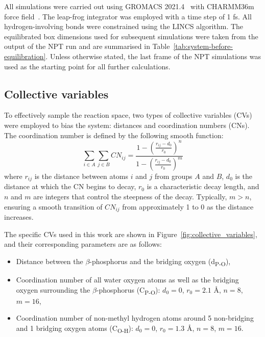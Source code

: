 All simulations were carried out using GROMACS 2021.4~\citep{abrahamGROMACSHighPerformance2015} with CHARMM36m force field~\citep{huangCHARMM36mImprovedForce2017}. The leap-frog integrator was employed with a time step of 1 fs. All hydrogen-involving bonds were constrained using the LINCS algorithm. The equilibrated box dimensions used for subsequent simulations were taken from the output of the NPT run and are summarised in Table~\ref{tab:system-before-equilibration}. Unless otherwise stated, the last frame of the NPT simulations was used as the starting point for all further calculations.



\subsection{Collective variables}
To effectively sample the reaction space, two types of collective variables (CVs) were employed to bias the system: distances and coordination numbers (CNs). The coordination number is defined by the following smooth function:
\begin{equation}
    \sum_{i \in A} \sum_{j \in B} CN_{ij} = \frac{1 - \left( \frac{r_{ij} - d_0}{r_0} \right)^n}{1 - \left( \frac{r_{ij} - d_0}{r_0} \right)^m}
    \label{eq:coordination_number}
\end{equation}
where $r_{ij}$ is the distance between atoms $i$ and $j$ from groups $A$ and $B$, $d_0$ is the distance at which the CN begins to decay, $r_0$ is a characteristic decay length, and $n$ and $m$ are integers that control the steepness of the decay. Typically, $m > n$, ensuring a smooth transition of $CN_{ij}$ from approximately 1 to 0 as the distance increases.

The specific CVs used in this work are shown in Figure~\ref{fig:collective_variables}, and their corresponding parameters are as follows:

\begin{itemize}
    \item Distance between the $\beta$-phosphorus and the bridging oxygen (d\textsubscript{P-O}),
    \item Coordination number of all water oxygen atoms as well as the bridging oxygen surrounding the $\beta$-phosphorus (C\textsubscript{P-O}): $d_0 = 0$, $r_0 = 2.1$ \AA, $n = 8$, $m = 16$,
    \item Coordination number of non-methyl hydrogen atoms around 5 non-bridging and 1 bridging oxygen atoms (C\textsubscript{O-H}): $d_0 = 0$, $r_0 = 1.3$ \AA, $n = 8$, $m = 16$.
\end{itemize}

